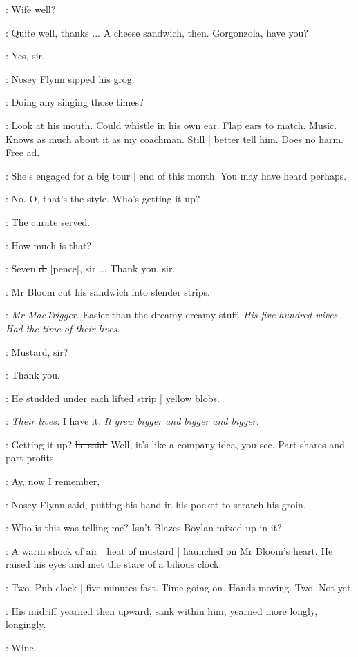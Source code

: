 \nosey:
Wife well?

\Bloom:
Quite well,
thanks ...
A cheese sandwich, then.
Gorgonzola,
have you?

\curate:
Yes, sir.

:
Nosey Flynn sipped his grog.

\nosey:
Doing any singing those times?

\BloomInt:
Look at his mouth.
Could whistle in his own ear.
Flap ears to match.
Music.
Knows as much about it as my coachman.
Still |
better tell him.
Does no harm.
Free ad.

\Bloom:
She's engaged for a big tour |
end of this month.
You may have heard perhaps.

\nosey:
No.
O, that's the style.
Who's getting it up?

:
The curate served.

\Bloom:
How much is that?

\curate:
Seven \sout{d.} [pence], sir ...
Thank you, sir.

:
Mr Bloom cut his sandwich into slender strips.

\BloomInt:
\emph{Mr MacTrigger.}
Easier than the dreamy creamy stuff.
\emph{His five hundred wives.
Had the time of their lives.}

\curate:
Mustard, sir?

\Bloom:
Thank you.

:
He studded under each lifted strip |
yellow blobs.

\BloomInt:
\emph{Their lives.}
I have it.
\emph{It grew bigger and bigger and bigger.}

\Bloom:
Getting it up?
\sout{he said.}
Well, it's like a company idea, you see.
Part shares and part profits.

\nosey:
Ay, now I remember,

:
Nosey Flynn said,
putting his hand in his pocket to scratch his groin.

\nosey:
Who is this was telling me?
Isn't Blazes Boylan mixed up in it?

:
A warm shock of air |
heat of mustard |
haunched on Mr Bloom's heart.
He raised his eyes and met the stare of a bilious clock.

\BloomInt:
Two.
Pub clock |
five minutes fast.
Time going on.
Hands moving.
Two.
Not yet.

:
His midriff yearned then upward,
sank within him,
yearned more longly,
longingly.

\BloomInt:
Wine.


